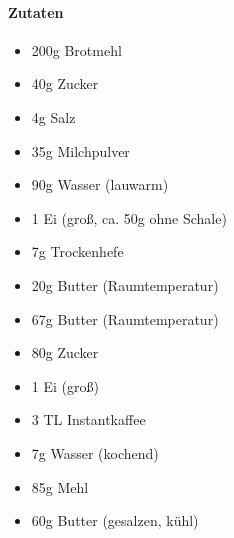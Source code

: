 \clearpage
{}

\paragraph{Zutaten}
\begin{itemize}[noitemsep]
	\item 200g Brotmehl
	\item 40g Zucker
	\item 4g Salz
	\item 35g Milchpulver
	\item 90g Wasser (lauwarm)
	\item 1 Ei (groß, ca. 50g ohne Schale)
	\item 7g Trockenhefe 
	\item 20g Butter (Raumtemperatur)
	\vspace{0.5cm}
	\item 67g Butter (Raumtemperatur)
	\item 80g Zucker
	\item 1 Ei (groß)
	\item 3 TL Instantkaffee 
	\item 7g Wasser (kochend)
	\item 85g Mehl
	\item 60g Butter (gesalzen, kühl)
\end{itemize}


